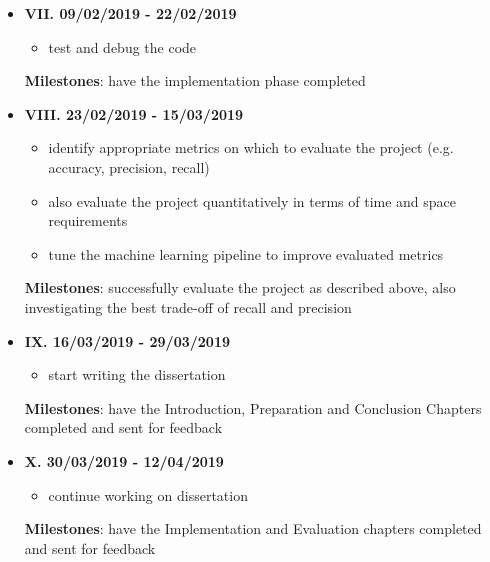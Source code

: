 \begin{itemize}
  \item \textbf{VII. 09/02/2019 - 22/02/2019}

        \begin{itemize}
          \item test and debug the code
        \end{itemize}

        \textbf{Milestones}: have the implementation phase completed \\



  \item \textbf{VIII. 23/02/2019 - 15/03/2019}

        \begin{itemize}
          \item identify appropriate metrics on which to evaluate the project (e.g. accuracy, precision, recall)
          \item also evaluate the project quantitatively in terms of time and space requirements
          \item tune the machine learning pipeline to improve evaluated metrics

        \end{itemize}

        \textbf{Milestones}: successfully evaluate the project as described above, also investigating the best trade-off of recall and precision \\



  \item \textbf{IX. 16/03/2019 - 29/03/2019}

        \begin{itemize}
          \item start writing the dissertation
        \end{itemize}

        \textbf{Milestones}: have the Introduction, Preparation and Conclusion Chapters completed and sent for feedback\\



  \item \textbf{X. 30/03/2019 - 12/04/2019}

        \begin{itemize}
          \item continue working on dissertation
        \end{itemize}

        \textbf{Milestones}: have the Implementation and Evaluation chapters completed and sent for feedback\\





\end{itemize}
